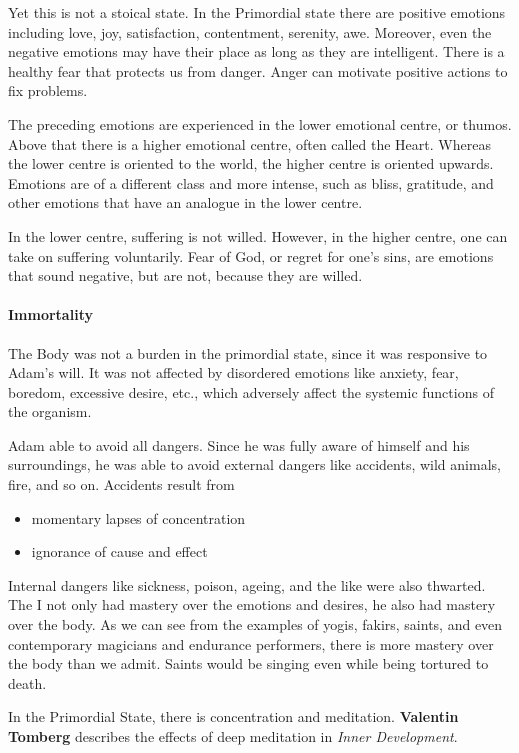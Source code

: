 Yet this is not a stoical state. In the Primordial state there are positive emotions including love, joy, satisfaction, contentment, serenity, awe. Moreover, even the negative emotions may have their place as long as they are intelligent. There is a healthy fear that protects us from danger. Anger can motivate positive actions to fix problems.

The preceding emotions are experienced in the lower emotional centre, or thumos. Above that there is a higher emotional centre, often called the Heart. Whereas the lower centre is oriented to the world, the higher centre is oriented upwards. Emotions are of a different class and more intense, such as bliss, gratitude, and other emotions that have an analogue in the lower centre.

In the lower centre, suffering is not willed. However, in the higher centre, one can take on suffering voluntarily. Fear of God, or regret for one's sins, are emotions that sound negative, but are not, because they are willed.

\paragraph{Immortality}
The Body was not a burden in the primordial state, since it was responsive to Adam's will. It was not affected by disordered emotions like anxiety, fear, boredom, excessive desire, etc., which adversely affect the systemic functions of the organism.

Adam able to avoid all dangers. Since he was fully aware of himself and his surroundings, he was able to avoid external dangers like accidents, wild animals, fire, and so on. Accidents result from

\begin{itemize}
\item momentary lapses of concentration 
\item ignorance of cause and effect 
\end{itemize}
Internal dangers like sickness, poison, ageing, and the like were also thwarted. The I not only had mastery over the emotions and desires, he also had mastery over the body. As we can see from the examples of yogis, fakirs, saints, and even contemporary magicians and endurance performers, there is more mastery over the body than we admit. Saints would be singing even while being tortured to death.

In the Primordial State, there is concentration and meditation. \textbf{Valentin Tomberg} describes the effects of deep meditation in \emph{Inner Development}.

